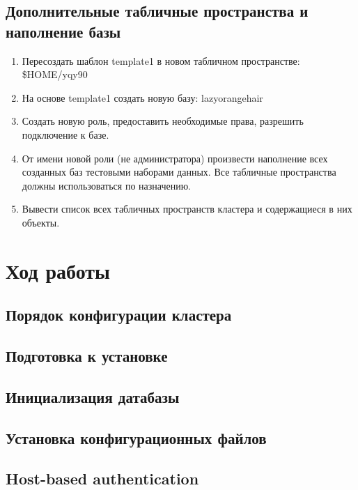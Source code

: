\documentclass{article}
\begin{document}
\subsection{Дополнительные табличные пространства и наполнение базы}

\begin{enumerate}
    \item Пересоздать шаблон template1 в новом табличном пространстве: \$HOME/yqy90
    \item На основе template1 создать новую базу: lazyorangehair
    \item Создать новую роль, предоставить необходимые права, разрешить подключение к базе.
    \item От имени новой роли (не администратора) произвести наполнение всех созданных баз тестовыми наборами данных. Все табличные пространства должны использоваться по назначению.
    \item Вывести список всех табличных пространств кластера и содержащиеся в них объекты.
\end{enumerate}

\section{Ход работы}

\subsection{Порядок конфигурации кластера}


\subsection{Подготовка к установке}


\subsection{Инициализация датабазы}


\subsection{Установка конфигурационных файлов}


\subsection{Host-based authentication}

\end{document}
